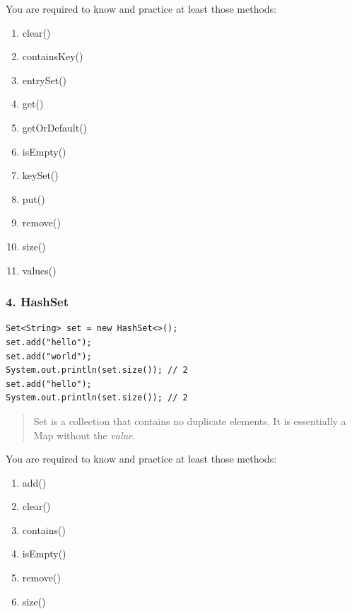 \documentclass[aspectratio=169, 14pt]{beamer}
\begin{document}
\begin{frame}
    You are required to know and practice at least those methods:
    \begin{enumerate}
        \item clear()
        \item containsKey()
        \item entrySet()
        \item get()
        \item getOrDefault()
        \item isEmpty()
        \item keySet()
        \item put()
        \item remove()
        \item size()
        \item values()
    \end{enumerate}
\end{frame}

\begin{frame}[fragile]
    \frametitle{4. HashSet}
    \begin{verbatim}
Set<String> set = new HashSet<>();
set.add("hello");
set.add("world");
System.out.println(set.size()); // 2
set.add("hello");
System.out.println(set.size()); // 2
    \end{verbatim}      
    \begin{quote}
        \alert{Set} is a collection that contains no duplicate elements. It is essentially a \alert{Map} without the \emph{value}.
    \end{quote}
\end{frame}

\begin{frame}
    You are required to know and practice at least those methods:

\begin{enumerate}
\item add()
\item clear()
\item contains()
\item isEmpty()
\item remove()
\item size()
\end{enumerate}
\end{frame}
\end{document}
